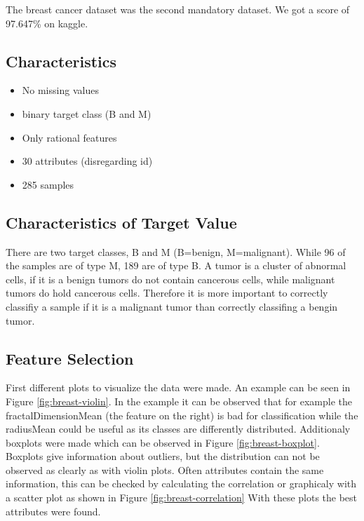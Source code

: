 The breast cancer dataset was the second mandatory dataset. We got a score of 97.647\% on kaggle. 

\subsection{Characteristics}

\begin{itemize}
\item No missing values
\item binary target class (B and M)
\item Only rational features
\item 30 attributes (disregarding id)
\item 285 samples
\end{itemize}

\subsection{Characteristics of Target Value}

There are two target classes, B and M (B=benign, M=malignant).
While 96 of the samples are of type M, 189 are of type B.
A tumor is a cluster of abnormal cells, if it is a benign tumors do not contain cancerous cells, while malignant tumors do hold cancerous cells.
Therefore it is more important to correctly classifiy a sample if it is a malignant tumor than correctly classifing a bengin tumor.



\subsection{Feature Selection}
First different plots to visualize the data were made. An example can be seen in Figure \ref{fig:breast-violin}.
In the example it can be observed that for example the fractalDimensionMean (the feature on the right) is bad for classification while the radiusMean could be useful as its classes are differently distributed.
Additionaly boxplots were made which can be observed in Figure \ref{fig:breast-boxplot}.
Boxplots give information about outliers, but the distribution can not be observed as clearly as with violin plots.
Often attributes contain the same information, this can be checked by calculating the correlation or graphicaly with a scatter plot as shown in Figure \ref{fig:breast-correlation}
With these plots the best attributes were found.

